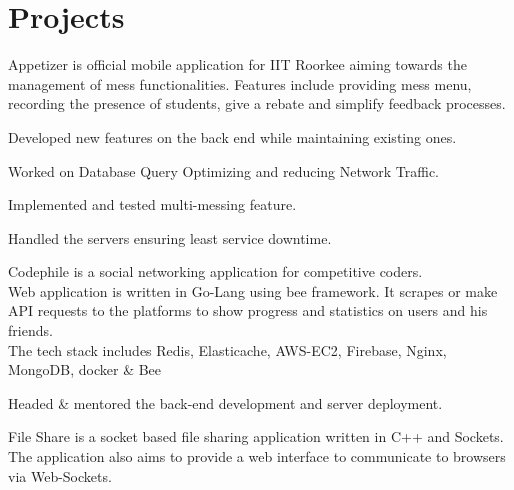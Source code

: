 \documentclass[letterpaper]{deedy-resume} %
\begin{document}
\begin{minipage}[t]{0.66\textwidth}

\section{Projects} 

Appetizer is official mobile application for IIT Roorkee aiming towards the management of mess functionalities. Features include providing mess menu, recording the presence of students, give a rebate and simplify feedback processes.
\begin{tightitemize}
\item Developed new features on the back end while maintaining existing ones.
\item Worked on Database Query Optimizing and reducing Network Traffic.
\item Implemented and tested multi-messing feature.
\item Handled the servers ensuring least service downtime.
\end{tightitemize}
\sectionspace %


Codephile is a social networking application for competitive coders.\\
Web application is written in Go-Lang using bee framework. It scrapes or make API requests to the platforms to show progress and statistics on users and his friends.\\
The tech stack includes Redis, Elasticache, AWS-EC2, Firebase, Nginx, MongoDB, docker \& Bee
\begin{tightitemize}
\item Headed \& mentored the back-end development and server deployment.
\end{tightitemize}
\sectionspace %

File Share is a socket based file sharing application written in C++ and Sockets. The application also aims to provide a web interface to communicate to browsers via Web-Sockets.

\sectionspace %


\end{minipage}
\end{document}
